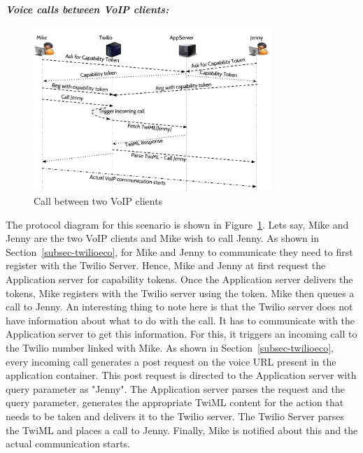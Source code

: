 \emph{\textbf{Voice calls between VoIP clients:} }
\begin{figure}[t!] 
\centering
  \includegraphics[width=0.8\textwidth]{figs/twoclients.pdf}
\caption{Call between two VoIP clients}
\label{fig:2VoIPcall}
\end{figure}
The protocol diagram for this scenario is shown in Figure~\ref{fig:2VoIPcall}. Lets say, Mike and Jenny are the two VoIP clients and Mike wish to call Jenny. As shown in Section~\ref{subsec-twilioeco}, for Mike and Jenny to communicate they need to first register with the Twilio Server. Hence, Mike and Jenny at first request the Application server for capability tokens. Once the Application server delivers the tokens, Mike registers with the Twilio server using the token. Mike then queues a call to Jenny. An interesting thing to note here is that the Twilio server does not have information about what to do with the call. It has to communicate with the Application server to get this information. For this, it triggers an incoming call to the Twilio number linked with Mike. As shown in Section~\ref{subsec-twilioeco}, every incoming call generates a post request on the voice URL present in the application container. This post request is directed to the Application server with query parameter as "Jenny". The Application server parses the request and the query parameter, generates the appropriate TwiML content for the action that needs to be taken and delivers it to the Twilio server. The Twilio Server parses the TwiML and places a call to Jenny. Finally, Mike is notified about this and the actual communication starts. 

